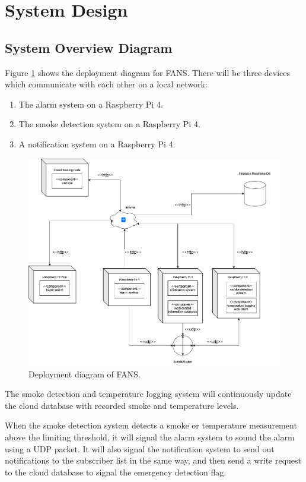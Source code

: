 \section{System Design}

\subsection{System Overview Diagram}

Figure \ref{fig:deployment} shows the deployment diagram for FANS. There will be three devices which communicate with
each other on a local network:

\begin{enumerate}
    \item The alarm system on a Raspberry Pi 4.
    \item The smoke detection system on a Raspberry Pi 4.
    \item A notification system on a Raspberry Pi 4.
\end{enumerate}

\begin{figure}[H]
    \centering
    \includegraphics[width=\linewidth]{../assets/FANSDeployment.png}
    \caption{Deployment diagram of FANS.}
    \label{fig:deployment}
\end{figure}

The smoke detection and temperature logging system will continuously update the cloud database with recorded smoke and
temperature levels.

When the smoke detection system detects a smoke or temperature measurement above the limiting threshold, it will signal
the alarm system to sound the alarm using a UDP packet. It will also signal the notification system to send out
notifications to the subscriber list in the same way, and then send a write request to the cloud database to signal the
emergency detection flag.

